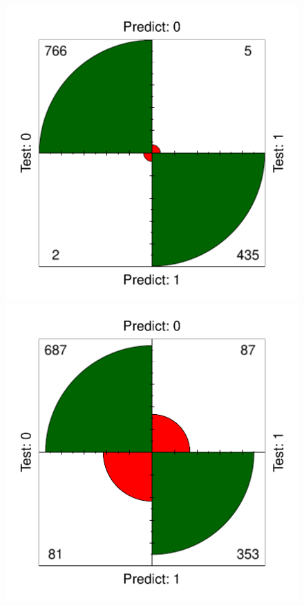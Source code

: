 \documentclass[12pt,%
               a4paper,%
               oneside,openany,%
               titlepage,%
               headinclude,footinclude,%
               BCOR5mm,%
               cleardoublepage=empty,%
               tablecaptionabove,%
               floatperchapter,
               ]{scrreprt}                 %
\begin{document}
\begin{figure}[ht]
  \begin{minipage}[b]{0.5\linewidth}
    \centering
    \includegraphics[width=.9\linewidth]{Figures/RF_confusion.pdf}
    \vspace{4ex}
  \end{minipage} 
  \begin{minipage}[b]{0.5\linewidth}
    \centering
    \includegraphics[width=.9\linewidth]{Figures/SVM_confusion.pdf}

\end{minipage}
\end{figure}
\end{document}
